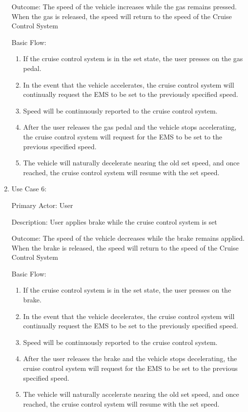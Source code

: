 \documentclass[preprint,11pt,3p]{article}
\begin{document}
\begin{enumerate}
			Outcome: The speed of the vehicle increases while the gas remains pressed. When the gas is released, the speed will return to the speed of the Cruise Control System\par
			Basic Flow:
		\begin{enumerate}
			\item If the cruise control system is in the set state, the user presses on the gas pedal.
			\item In the event that the vehicle accelerates, the cruise control system will continually request the EMS to be set to the previously specified speed.
			\item Speed will be continuously reported to the cruise control system.
			\item After the user releases the gas pedal and the vehicle stops accelerating, the cruise control system will request for the EMS to be set to the previous specified speed.
			\item The vehicle will naturally decelerate nearing the old set speed, and once reached, the cruise control system will resume with the set speed.
		\end{enumerate}
	\item 	Use Case 6: \par
			Primary Actor: User \par
			Description: User applies brake while the cruise control system is set \par
			Outcome: The speed of the vehicle decreases while the brake remains applied. When the brake is released, the speed will return to the speed of the Cruise Control System\par
			Basic Flow:
		\begin{enumerate}
			\item If the cruise control system is in the set state, the user presses on the brake.
			\item In the event that the vehicle decelerates, the cruise control system will continually request the EMS to be set to the previously specified speed.
			\item Speed will be continuously reported to the cruise control system.
			\item After the user releases the brake and the vehicle stops decelerating, the cruise control system will request for the EMS to be set to the previous specified speed.
			\item The vehicle will naturally accelerate nearing the old set speed, and once reached, the cruise control system will resume with the set speed.

\end{enumerate}
\end{enumerate}
\end{document}
